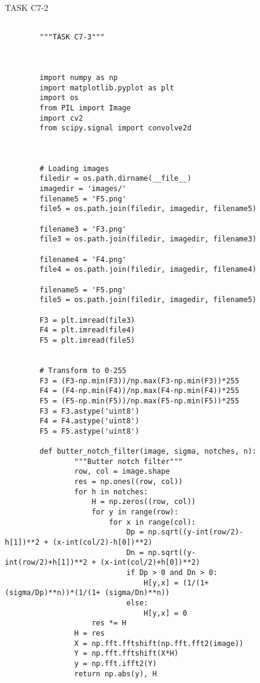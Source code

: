 {\begin{figure}[hbt!]
\begin{lstlisting}
    \end{lstlisting}
\caption{TASK C7-2}
\label{TASK C7-2}
\end{figure}



\begin{figure}[hbt!]
    \begin{lstlisting}

        """TASK C7-3"""



        import numpy as np 
        import matplotlib.pyplot as plt
        import os
        from PIL import Image
        import cv2
        from scipy.signal import convolve2d
        
        
        
        # Loading images
        filedir = os.path.dirname(__file__)
        imagedir = 'images/'
        filename5 = 'F5.png'
        file5 = os.path.join(filedir, imagedir, filename5)
        
        filename3 = 'F3.png'
        file3 = os.path.join(filedir, imagedir, filename3)
        
        filename4 = 'F4.png'
        file4 = os.path.join(filedir, imagedir, filename4)
        
        filename5 = 'F5.png'
        file5 = os.path.join(filedir, imagedir, filename5)
        
        F3 = plt.imread(file3)
        F4 = plt.imread(file4)
        F5 = plt.imread(file5)
        
        
        # Transform to 0-255
        F3 = (F3-np.min(F3))/np.max(F3-np.min(F3))*255
        F4 = (F4-np.min(F4))/np.max(F4-np.min(F4))*255
        F5 = (F5-np.min(F5))/np.max(F5-np.min(F5))*255
        F3 = F3.astype('uint8')
        F4 = F4.astype('uint8')
        F5 = F5.astype('uint8')
        
        def butter_notch_filter(image, sigma, notches, n):
                """Butter notch filter"""
                row, col = image.shape
                res = np.ones((row, col))
                for h in notches:
                    H = np.zeros((row, col))
                    for y in range(row):
                        for x in range(col):
                            Dp = np.sqrt((y-int(row/2)-h[1])**2 + (x-int(col/2)-h[0])**2)
                            Dn = np.sqrt((y-int(row/2)+h[1])**2 + (x-int(col/2)+h[0])**2)
                            if Dp > 0 and Dn > 0:
                                H[y,x] = (1/(1+ (sigma/Dp)**n))*(1/(1+ (sigma/Dn)**n))
                            else:
                                H[y,x] = 0
                    res *= H
                H = res
                X = np.fft.fftshift(np.fft.fft2(image))
                Y = np.fft.fftshift(X*H)
                y = np.fft.ifft2(Y)
                return np.abs(y), H
        

\end{lstlisting}
\end{figure}}
